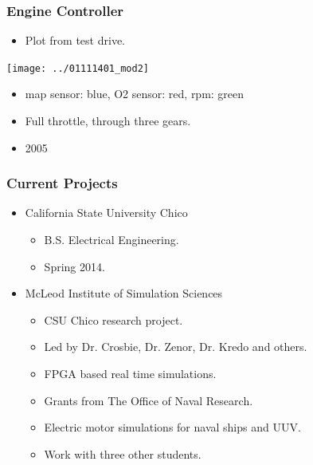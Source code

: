 \documentclass[gray]{beamer}
\begin{document}
\begin{frame}
\frametitle{Engine Controller}
\begin{center}
\begin{itemize}
\item Plot from test drive.
\end{itemize}
\texttt{[image: ../01111401\_mod2]}
\begin{itemize}
\item map sensor: blue, O2 sensor: red, rpm: green
\item Full throttle, through three gears.
\item 2005
\end{itemize}
\end{center}
\end{frame}

\begin{frame}

\frametitle{Current Projects}
\begin{itemize}
\item California State University Chico
	\begin{itemize}
	\item B.S. Electrical Engineering.
	\item Spring 2014.
	\end{itemize}
\item McLeod Institute of Simulation Sciences
	\begin{itemize}
	\item CSU Chico research project.
	\item Led by Dr. Crosbie, Dr. Zenor, Dr. Kredo and others.
	\item FPGA based real time simulations.
	\item Grants from The Office of Naval Research.
	\item Electric motor simulations for naval ships and UUV. 
	\item Work with three other students.
	\end{itemize}
\end{itemize}

\end{frame}

\end{document}
